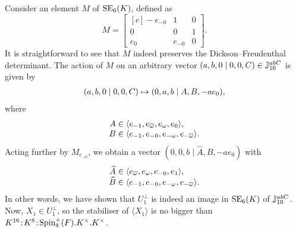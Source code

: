 Consider an element $M$ of $\mathrm{SE}_6(K)$, defined as
\begin{equation*}
	M = \begin{bmatrix}[c]
		- e_{-0} & 1 & 0 \\
		0 & 0 & 1 \\
		e_0 & e_{-0} & 0
	\end{bmatrix}.
\end{equation*}
It is straightforward to see that $M$ indeed preserves
the Dickson--Freudenthal determinant. The action of
$M$ on an arbitrary vector $(a,b,0\mid 0,0,C) \in \mathbb{J}_{10}^{abC}$
is given by
\begin{equation*}
	\begin{array}{r@{\;}c@{\;}l}
		(a,b,0\mid 0,0,C) & \mapsto & (0,a,b \mid A, B, -a e_0),\\
	\end{array}
\end{equation*}
where 
\begin{equation*}
	\begin{array}{r@{\;}c@{\;}l}
			A & \in & \langle e_{-1}, e_{\bar{\omega}},
						e_{\omega}, e_0 \rangle, \\
		B & \in & \langle e_{-1}, e_{-0}, e_{-\omega}, 
						e_{-\bar{\omega}} \rangle.	
	\end{array}
\end{equation*}
Acting further by $M_{e_{-0}}$, we obtain a vector
$(0,0,b \mid \hat{A}, \hat{B}, -a e_0)$ with
\begin{equation*}
	\begin{array}{r@{\;}c@{\;}l}
		\hat{A} & \in & \langle e_{\bar{\omega}}, e_{\omega}, e_{-0}, e_1 \rangle, \\
		\hat{B} & \in & \langle e_{-1}, e_{-0}, e_{-\omega}, e_{-\bar{\omega}} \rangle.
	\end{array}
\end{equation*}
In other words, we have shown that $U_1^{\perp}$ is indeed
an image in $\mathrm{SE}_6(K)$ of $\mathbb{J}_{10}^{abC}$. 
Now, $X_1 \in U_1^{\perp}$, so the
stabiliser of $\langle X_1 \rangle$ is no bigger than  
\mbox{$K^{16}\mathord{{\;\!{:}\;\!}} K^8 \mathord{{\;\!{:}\;\!}} \mathrm{Spin}_8^+(F).K^{\times}.K^{\times}$}.


